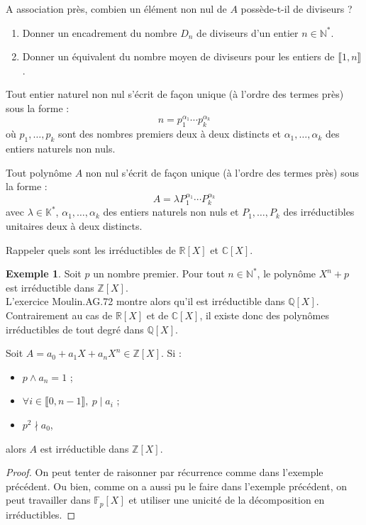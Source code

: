 \documentclass[french]{article}
\newcommand{\N}{\mathbb{N}}
\newcommand{\Z}{\mathbb{Z}}
\newcommand{\Q}{\mathbb{Q}}
\newcommand{\R}{\mathbb{R}}
\newcommand{\C}{\mathbb{C}}
\newcommand{\K}{\mathbb{K}}
\newcommand{\st}{^*}
\newcommand{\F}{\mathbb{F}}
\theoremstyle{plain}
\theoremstyle{definition}
\newtheorem*{ex}{Exemple}
\theoremstyle{remark}
\begin{document}
\begin{exo}
	A association près, combien un élément non nul de $A$ possède-t-il de diviseurs ?
\end{exo}

\begin{exo}
	\begin{enumerate}
		\item Donner un encadrement du nombre $D_n$ de diviseurs d'un entier $n\in\N\st$.
		\item Donner un équivalent du nombre moyen de diviseurs pour les entiers de $\llbracket1,n\rrbracket$.
	\end{enumerate}
\end{exo}

\begin{cor}%
	Tout entier naturel non nul s'écrit de façon unique (à l'ordre des termes près) sous la forme :
	$$n=p_1^{\alpha_1}\cdots p_k^{\alpha_k}$$ où $p_1,\ldots,p_k$ sont des nombres premiers deux à deux distincts et $\alpha_1,\ldots,\alpha_k$ des entiers naturels non nuls.
\end{cor}

\begin{cor}%
	Tout polynôme $A$ non nul s'écrit de façon unique (à l'ordre des termes près) sous la forme :
	$$A=\lambda P_1^{\alpha_1}\cdots P_k^{\alpha_k}$$
	avec $\lambda\in\K\st$, $\alpha_1,\ldots,\alpha_k$ des entiers naturels non nuls et $P_1,\ldots,P_k$ des irréductibles unitaires deux à deux distincts.
\end{cor}

\begin{exo}
	Rappeler quels sont les irréductibles de $\R[X]$ et $\C[X]$.
\end{exo}

\begin{ex}
	Soit $p$ un nombre premier. Pour tout $n\in\N\st$, le polynôme $X^n+p$ est irréductible dans $\Z[X]$. \\
	L'exercice Moulin.AG.72 montre alors qu'il est irréductible dans $\Q[X]$. Contrairement au cas de $\R[X]$ et de $\C[X]$, il existe donc des polynômes irréductibles de tout degré dans $\Q[X]$.
\end{ex}

\begin{thm}%
	Soit $A=a_0+a_1X+a_nX^n\in\Z[X]$. Si :
	\begin{itemize}
		\item $p\wedge a_n=1$ ;
		\item $\forall i\in\llbracket0,n-1\rrbracket,\ p\mid a_i$ ;
		\item $p^2\nmid a_0$,
	\end{itemize} alors $A$ est irréductible dans $\Z[X]$.
\end{thm}
\begin{proof}
	On peut tenter de raisonner par récurrence comme dans l'exemple précédent. Ou bien, comme on a aussi pu le faire dans l'exemple précédent, on peut travailler dans $\F_p[X]$ et utiliser une unicité de la décomposition en irréductibles.
\end{proof}
\end{document}
